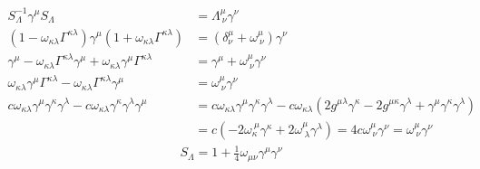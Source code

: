 \documentclass[uplatex,dvipdfmx,a4paper,11pt]{jlreq}
\theoremstyle{definition}
\numberwithin{equation}{section}
\begin{document}
\begin{align}
  S_\Lambda^{-1}\gamma^\mu S_\Lambda                                                                                           & = \Lambda^\mu_{\ \nu}\gamma^\nu                                                                                                                                                               \\
  (1 - \omega_{\kappa\lambda}\Gamma^{\kappa\lambda})\gamma^\mu(1 + \omega_{\kappa\lambda}\Gamma^{\kappa\lambda})               & = (\delta^\mu_\nu + \omega^\mu_{\ \nu})\gamma^\nu                                                                                                                                             \\
  \gamma^\mu - \omega_{\kappa\lambda}\Gamma^{\kappa\lambda}\gamma^\mu + \omega_{\kappa\lambda}\gamma^\mu\Gamma^{\kappa\lambda} & = \gamma^\mu + \omega^\mu_{\ \nu}\gamma^\nu                                                                                                                                                   \\
  \omega_{\kappa\lambda}\gamma^\mu\Gamma^{\kappa\lambda} - \omega_{\kappa\lambda}\Gamma^{\kappa\lambda}\gamma^\mu              & = \omega^\mu_{\ \nu}\gamma^\nu                                                                                                                                                                \\
  c\omega_{\kappa\lambda}\gamma^\mu\gamma^\kappa\gamma^\lambda - c\omega_{\kappa\lambda}\gamma^\kappa\gamma^\lambda\gamma^\mu  & = c\omega_{\kappa\lambda}\gamma^\mu\gamma^\kappa\gamma^\lambda - c\omega_{\kappa\lambda}(2g^{\mu\lambda}\gamma^\kappa - 2g^{\mu\kappa}\gamma^\lambda + \gamma^\mu\gamma^\kappa\gamma^\lambda) \\
                                                                                                                               & = c(-2\omega_{\kappa}^{\ \mu}\gamma^\kappa + 2\omega^\mu_{\ \lambda}\gamma^\lambda) = 4c\omega_{\ \nu}^{\mu}\gamma^\nu = \omega^\mu_{\ \nu}\gamma^\nu
\end{align}
\begin{align}
  S_\Lambda = 1 + \frac{1}{4}\omega_{\mu\nu}\gamma^\mu\gamma^\nu
\end{align}
\end{document}
